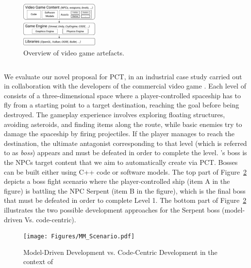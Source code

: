 \begin{figure}[h]
    \centering
    \includegraphics[width=0.35\textwidth]{Figures/fig_bg_OverviewArtifactsVG.pdf}
    \caption{Overview of video game artefacts.}
    \label{fig:architecture}
\end{figure}

\subsection{\CaseStudy{}}
We evaluate our novel proposal for PCT, \ApproachName{} in an industrial case study carried out in collaboration with the developers of the commercial video game \CaseStudy{}. Each level of \CaseStudy{} consists of a three-dimensional space where a player-controlled spaceship has to fly from a starting point to a target destination, reaching the goal before being destroyed. The gameplay experience involves exploring floating structures, avoiding asteroids, and finding items along the route, while basic enemies try to damage the spaceship by firing projectiles. If the player manages to reach the destination, the ultimate antagonist corresponding to that level (which is referred to as \textit{boss}) appears and must be defeated in order to complete the level. \CaseStudy{}'s boss is the NPCs target content that we aim to automatically create via PCT. Bosses can be built either using C++ code or software models. The top part of Figure~\ref{fig:scenario} depicts a boss fight scenario where the player-controlled ship (item A in the figure) is battling the NPC Serpent (item B in the figure), which is the final boss that must be defeated in order to complete Level 1. The bottom part of Figure~\ref{fig:scenario}  illustrates the two possible development approaches for the Serpent boss (model-driven Vs. code-centric).

\begin{figure}[tb]
    \centering
    \texttt{[image: Figures/MM\_Scenario.pdf]}
    \caption{Model-Driven Development vs. Code-Centric Development in the context of \CaseStudy{}}
    \label{fig:scenario}
\end{figure}

